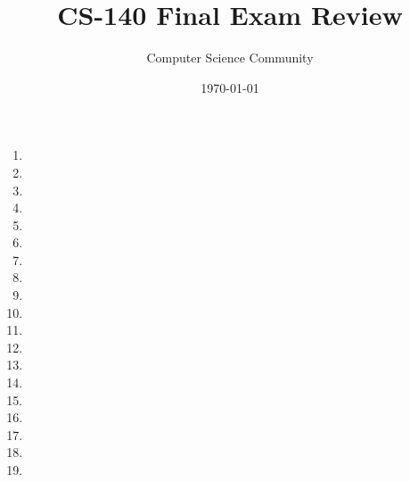 \documentclass[11pt]{article}
\author{Computer Science Community}
\title{CS-140 Final Exam Review}
\date{\today}
\begin{document}
\header

\begin{enumerate}
\item 

\item 

\item 

\pagebreak
\item 

\item 

\pagebreak
\item 

\pagebreak
\item 
\vspace{1in}

\item 

\pagebreak
\item 

\pagebreak
\item 

\item 

\pagebreak
\item 

\item 

\item 

\item 

\pagebreak
\item 

\item 

\item 

\item 


\end{enumerate}
\end{document}
